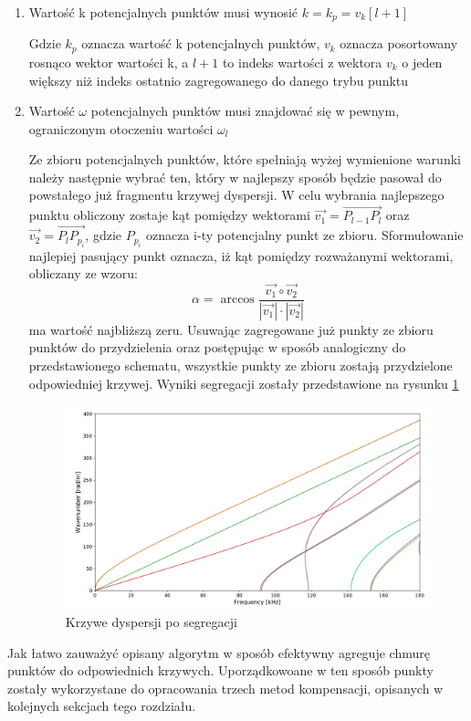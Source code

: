 \begin{enumerate}
 \item Wartość k potencjalnych punktów musi wynosić $k=k_p=v_k[l+1]$
 
 Gdzie $k_p$ oznacza wartość k potencjalnych punktów, $v_k$ oznacza posortowany rosnąco wektor wartości k, a $l+1$ to indeks wartości z wektora $v_k$ o jeden większy niż indeks ostatnio zagregowanego do danego trybu punktu
 \item Wartość $\omega$ potencjalnych punktów musi znajdować się w pewnym, ograniczonym otoczeniu wartości $\omega _l$
 
 Ze zbioru potencjalnych punktów, które spełniają wyżej wymienione warunki należy następnie wybrać ten, który w najlepszy sposób będzie pasował do powstałego już fragmentu krzywej dyspersji. W celu wybrania najlepszego punktu obliczony zostaje kąt pomiędzy wektorami $\overrightarrow{v_1} = \overrightarrow{P_{l-1}P_l}$ oraz $\overrightarrow{v_2} = \overrightarrow{P_lP_{p_i}}$, gdzie $P_{p_i}$ oznacza i-ty potencjalny punkt ze zbioru. Sformułowanie najlepiej pasujący punkt oznacza, iż kąt pomiędzy rozważanymi wektorami, obliczany ze wzoru:
 \begin{equation}
 \alpha = \arccos\frac{\overrightarrow{v_1} \circ \overrightarrow{v_2}}{|\overrightarrow{v_1}|\cdot|\overrightarrow{v_2}|}
\end{equation}  
ma wartość najbliższą zeru. Usuwając zagregowane już punkty ze zbioru punktów do przydzielenia oraz postępując w sposób analogiczny do przedstawionego schematu, wszystkie punkty ze zbioru zostają przydzielone odpowiedniej krzywej. Wyniki segregacji zostały przedstawione na rysunku \ref{fig:krzywe_po_agregacji}
 
\begin{figure}[h]
\centering
\includegraphics[width=15cm]{Zdjecia/4/zagregowane_krzywe}
\caption{Krzywe dyspersji po segregacji}
\label{fig:krzywe_po_agregacji}
\end{figure}
\end{enumerate}  

Jak łatwo zauważyć opisany algorytm w sposób efektywny agreguje chmurę punktów do odpowiednich krzywych. Uporządkowoane w ten sposób punkty zostały wykorzystane do opracowania trzech metod kompensacji, opisanych w kolejnych sekcjach tego rozdziału.




